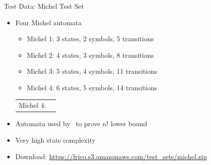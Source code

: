 \documentclass[12pt,handout]{beamer}
\begin{document}
\newcommand{\Michel}{
\begin{tikzpicture}[my automaton,semithick]
\scriptsize
\node[state,initial,accepting] (0)               {$q_0$};
\node[state,yshift=-0.2cm]                   (x) [below=of 0]  {$q_\#$};
\draw[->] (0) edge node[left] {\tiny\#} (x);
\draw[->] (x) edge[my below,loop] node[below] {\tiny $\#,1,2,3,4$} ();
\node[state,xshift=1cm]        (1) [right=of 0]  {$q_1$};
\draw[<->] (0) edge node[above,xshift=2mm,yshift=-0.5mm] {\tiny $1$} (1);
\draw[->] (1) edge[my right,loop] node[right] {\tiny $\#,1,2,3,4$} ();
\node[state,yshift=0.5cm]      (2) [below=of 1]  {$q_2$};
\draw[<->] (0) edge node[above,xshift=2mm,yshift=-1mm] {\tiny $2$} (2);
\draw[->] (2) edge[my right,loop] node[right] {\tiny $\#,1,2,3,4$} ();
\node[state,yshift=0.5cm]      (3) [below=of 2]  {$q_3$};
\draw[<->] (0) edge node[above,xshift=2mm,yshift=-1.5mm] {\tiny $3$} (3);
\draw[->] (3) edge[my right,loop] node[right] {\tiny $\#,1,2,3,4$} ();
\node[state,yshift=0.5cm]      (4) [below=of 3]  {$q_4$};
\draw[<->,shorten >=-0.2mm,shorten <=-0.2mm] (0) edge node[above,xshift=2mm,yshift=-2mm] {\tiny $4$} (4);
\draw[->] (4) edge[my right,loop] node[right] {\tiny $\#,1,2,3,4$} ();
\end{tikzpicture}
}

\begin{frame}{Test Data: Michel Test Set}
\begin{itemize}
\item Four Michel automata
  \begin{itemize}
  \item Michel 1: 3 states, 2 symbols, 5 transitions
  \item Michel 2: 4 states, 3 symbols, 8 transitions
  \item Michel 3: 5 states, 4 symbols, 11 transitions
  \item Michel 4: 6 states, 5 symbols, 14 transitions
  \end{itemize}

\centering
{\renewcommand{\tabcolsep}{0cm}
\begin{tabular}{m{1.75cm}m{7cm}}
Michel 4: & \Michel
\end{tabular}}

\pause
\raggedright
\item Automata used by~\cite{michel1988} to prove $n!$ lower bound
\item Very high state complexity
\pause
\item Download: \url{https://frico.s3.amazonaws.com/test_sets/michel.zip}
\end{itemize}
\end{frame}
\end{document}
